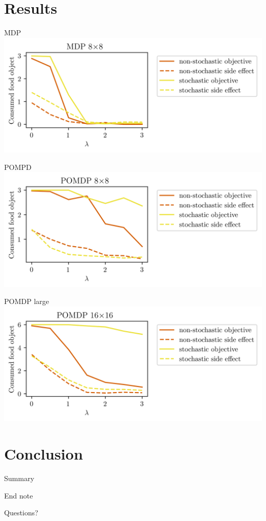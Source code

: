 \documentclass[10pt]{beamer}
\begin{document}
\section{Results}

\begin{frame}{MDP}
  \centering
  \includegraphics[scale=0.8]{"./figures/static_8x8_result_plot.png"}
\end{frame}

\begin{frame}{POMPD}
  \centering
  \includegraphics[scale=0.8]{"./figures/pomdp_8x8_result_plot.png"}
\end{frame}

\begin{frame}{POMDP large}
  \centering
  \includegraphics[scale=0.8]{"./figures/pomdp_16x16_result_plot.png"}
\end{frame}


\section{Conclusion}

\begin{frame}{Summary}
  \null
\end{frame}

\begin{frame}{End note}
  \null
\end{frame}

{
\begin{frame}[standout]
  Questions?
\end{frame}
}



\end{document}

